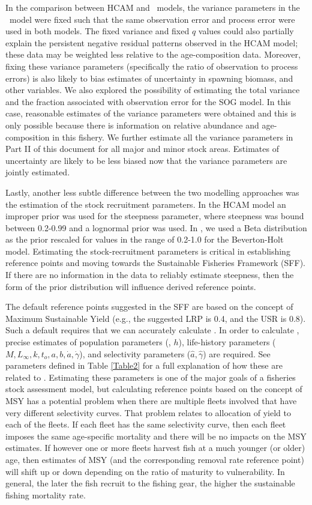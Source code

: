In the comparison between HCAM and  \iscam\ models, the variance parameters in the \iscam\ model were fixed such that the same observation error and process error were used in both models.  The fixed variance and fixed $q$ values could also partially explain the persistent negative residual patterns observed in the HCAM model; these data may be weighted less relative to the age-composition data.  Moreover, fixing these variance parameters  (specifically the ratio of observation to process errors) is also likely to bias estimates of uncertainty in spawning biomass, and other variables.  We also explored the possibility of estimating the total variance and the fraction associated with observation error for the SOG model.  In this case, reasonable estimates of the variance parameters were obtained and this is only possible because there is information on relative abundance and age-composition in this fishery.    We further estimate all the variance parameters in Part II of this document for all major and minor stock areas.
Estimates of uncertainty are likely to be less biased now that the variance parameters are jointly estimated.

Lastly, another less subtle difference between the two modelling approaches was the estimation of the stock recruitment parameters.  In the HCAM model an improper prior was used for the steepness parameter, where steepness was bound between 0.2-0.99 and a lognormal prior was used.  In \iscam, we used a Beta distribution as the prior rescaled for values in the range of 0.2-1.0 for the Beverton-Holt model.   Estimating the stock-recruitment parameters is critical in establishing reference points and moving towards the Sustainable Fisheries Framework (SFF).  If there are no information in the data to reliably estimate steepness, then the form of the prior distribution will influence derived reference points.

The default reference points suggested in the SFF are based on the concept of Maximum Sustainable Yield (e.g., the suggested LRP is 0.4\bmsy, and the USR is 0.8\bmsy).  Such a default requires that we can accurately calculate \bmsy.  In order to calculate \bmsy, precise estimates of population parameters (\bo, $h$), life-history parameters ($M,L_\infty,k,t_o,a,b,\dot{a},\dot{\gamma}$), and  selectivity parameters ($\hat{a},\hat{\gamma}$) are required. See parameters defined in Table \ref{Table2} for a full explanation of how these are related to \bmsy.  Estimating these parameters is one of the major goals of a fisheries stock assessment model, but calculating reference points based on the concept of MSY has a potential problem when there are multiple fleets involved that have very different selectivity curves. That problem relates to allocation of yield to each of the fleets.  If each fleet has the same selectivity curve, then each fleet imposes the same age-specific mortality and there will be no impacts on the MSY estimates.  If however one or more fleets harvest fish at a much younger (or older) age, then estimates of MSY (and the corresponding removal rate reference point) will shift up or down depending on the ratio of maturity to vulnerability.  In general, the later the fish recruit to the fishing gear, the higher the sustainable fishing mortality rate.  

